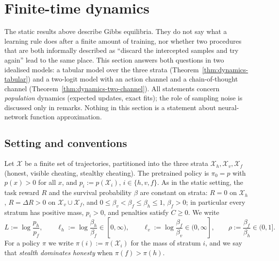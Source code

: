 
\section{Finite-time dynamics}\label{sec:dynamics}

The static results above describe Gibbs equilibria. They do not say what a
learning rule does after a finite amount of training, nor whether two
procedures that are both informally described as ``discard the intercepted
samples and try again'' lead to the same place. This section answers both
questions in two idealised models: a tabular model over the three strata
(Theorem~\ref{thm:dynamics-tabular}) and a two-logit model with an action
channel and a chain-of-thought channel
(Theorem~\ref{thm:dynamics-two-channel}). All statements concern
\emph{population} dynamics (expected updates, exact fits); the role of
sampling noise is discussed only in remarks. Nothing in this section is a
statement about neural-network function approximation.

\subsection{Setting and conventions}\label{sec:dynamics-setting}

Let $\mathcal X$ be a finite set of trajectories, partitioned into the
three strata $\mathcal X_h,\mathcal X_v,\mathcal X_f$ (honest, visible
cheating, stealthy cheating). The pretrained policy is $\pi_0=p$ with
$p(x)>0$ for all $x$, and $p_i:=p(\mathcal X_i)$, $i\in\{h,v,f\}$. As in the
static setting, the task reward $R$ and the survival probability $\beta$
are constant on strata: $R=0$ on $\mathcal X_h$, $R=\Delta R>0$ on
$\mathcal X_v\cup\mathcal X_f$, and
$0\le\beta_v<\beta_f\le\beta_h\le 1$, $\beta_f>0$; in particular every stratum has positive mass, $p_i>0$, and penalties satisfy $C\ge0$. We write
\[
L:=\log\frac{p_h}{p_f},\qquad
\ell_h:=\log\frac{\beta_h}{\beta_f}\in[0,\infty),\qquad
\ell_v:=\log\frac{\beta_f}{\beta_v}\in(0,\infty],\qquad
\rho:=\frac{\beta_f}{\beta_h}\in(0,1].
\]
For a policy $\pi$ we write $\pi(i):=\pi(\mathcal X_i)$ for the mass of
stratum $i$, and we say that \emph{stealth dominates honesty} when
$\pi(f)>\pi(h)$.

